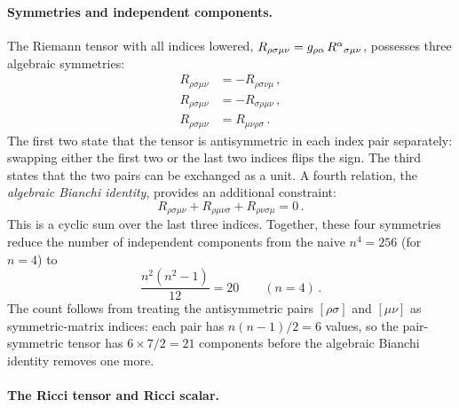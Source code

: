 \paragraph{Symmetries and independent components.}

The Riemann tensor with all indices lowered,
$R_{\rho\sigma\mu\nu} = g_{\rho\alpha}\,R^{\alpha}{}_{\sigma \mu \nu}$,
possesses three algebraic symmetries:
%
\begin{align}
  R_{\rho\sigma\mu\nu} &= -R_{\rho\sigma\nu\mu} \,,
  \label{eq:riemann-antisym1} \\
  R_{\rho\sigma\mu\nu} &= -R_{\sigma\rho\mu\nu} \,,
  \label{eq:riemann-antisym2} \\
  R_{\rho\sigma\mu\nu} &= R_{\mu\nu\rho\sigma} \,.
  \label{eq:riemann-pairsym}
\end{align}
%
The first two state that the tensor is antisymmetric in each index pair
separately: swapping either the first two or the last two indices flips the
sign.  The third states that the two pairs can be exchanged as a unit.  A
fourth relation, the \emph{algebraic Bianchi identity}, provides an
additional constraint:
%
\begin{equation}
  R_{\rho\sigma\mu\nu} + R_{\rho\mu\nu\sigma} + R_{\rho\nu\sigma\mu} = 0 \,.
  \label{eq:bianchi-algebraic}
\end{equation}
%
This is a cyclic sum over the last three indices.  Together, these four
symmetries reduce the number of independent components from the naive
$n^4 = 256$ (for $n = 4$) to
%
\begin{equation}
  \frac{n^2(n^2 - 1)}{12} = 20 \qquad (n = 4) \,.
  \label{eq:riemann-count}
\end{equation}
%
The count follows from treating the antisymmetric pairs $[\rho\sigma]$ and
$[\mu\nu]$ as symmetric-matrix indices: each pair has $n(n-1)/2 = 6$ values,
so the pair-symmetric tensor has $6 \times 7/2 = 21$ components before the
algebraic Bianchi identity removes one more.

\paragraph{The Ricci tensor and Ricci scalar.}

